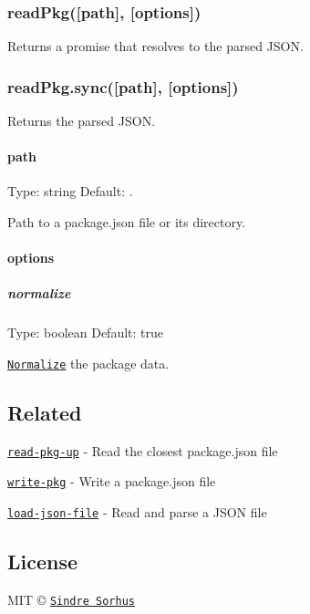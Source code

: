 \subsubsection*{read\+Pkg(\mbox{[}path\mbox{]}, \mbox{[}options\mbox{]})}

Returns a promise that resolves to the parsed J\+S\+ON.

\subsubsection*{read\+Pkg.\+sync(\mbox{[}path\mbox{]}, \mbox{[}options\mbox{]})}

Returns the parsed J\+S\+ON.

\paragraph*{path}

Type\+: {\ttfamily string} Default\+: {\ttfamily .}

Path to a {\ttfamily package.\+json} file or its directory.

\paragraph*{options}

\subparagraph*{normalize}

Type\+: {\ttfamily boolean} Default\+: {\ttfamily true}

\href{https://github.com/npm/normalize-package-data#what-normalization-currently-entails}{\tt Normalize} the package data.

\subsection*{Related}


\begin{DoxyItemize}
\item \href{https://github.com/sindresorhus/read-pkg-up}{\tt read-\/pkg-\/up} -\/ Read the closest package.\+json file
\item \href{https://github.com/sindresorhus/write-pkg}{\tt write-\/pkg} -\/ Write a {\ttfamily package.\+json} file
\item \href{https://github.com/sindresorhus/load-json-file}{\tt load-\/json-\/file} -\/ Read and parse a J\+S\+ON file
\end{DoxyItemize}

\subsection*{License}

M\+IT © \href{http://sindresorhus.com}{\tt Sindre Sorhus} 